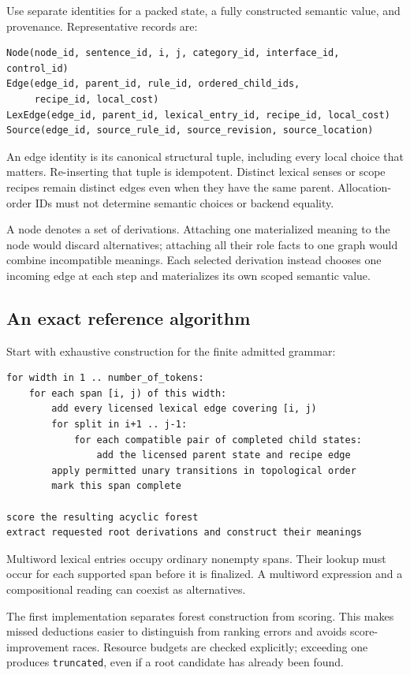 \documentclass[11pt,a4paper]{article}
\newcommand{\code}[1]{\texttt{#1}}
\begin{document}
Use separate identities for a packed state, a fully constructed semantic
value, and provenance. Representative records are:
\begin{lstlisting}
Node(node_id, sentence_id, i, j, category_id, interface_id, control_id)
Edge(edge_id, parent_id, rule_id, ordered_child_ids,
     recipe_id, local_cost)
LexEdge(edge_id, parent_id, lexical_entry_id, recipe_id, local_cost)
Source(edge_id, source_rule_id, source_revision, source_location)
\end{lstlisting}
An edge identity is its canonical structural tuple, including every local
choice that matters. Re-inserting that tuple is idempotent. Distinct
lexical senses or scope recipes remain distinct edges even when they have
the same parent. Allocation-order IDs must not determine semantic choices
or backend equality.

A node denotes a set of derivations. Attaching one materialized meaning to
the node would discard alternatives; attaching all their role facts to one
graph would combine incompatible meanings. Each selected derivation instead
chooses one incoming edge at each step and materializes its own scoped
semantic value.

\subsection{An exact reference algorithm}
Start with exhaustive construction for the finite admitted grammar:
\begin{lstlisting}
for width in 1 .. number_of_tokens:
    for each span [i, j) of this width:
        add every licensed lexical edge covering [i, j)
        for split in i+1 .. j-1:
            for each compatible pair of completed child states:
                add the licensed parent state and recipe edge
        apply permitted unary transitions in topological order
        mark this span complete

score the resulting acyclic forest
extract requested root derivations and construct their meanings
\end{lstlisting}
Multiword lexical entries occupy ordinary nonempty spans. Their lookup must
occur for each supported span before it is finalized. A multiword expression
and a compositional reading can coexist as alternatives.

The first implementation separates forest construction from scoring.
This makes missed deductions easier to distinguish from ranking errors and
avoids score-improvement races. Resource budgets are checked explicitly;
exceeding one produces \code{truncated}, even if a root candidate has already
been found.
\end{document}
